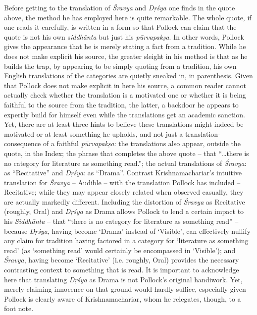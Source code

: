 Before getting to the translation of \textit{Śravya} and \textit{Dṛśya} one finds in the quote above, the method he has employed here is quite remarkable. The whole quote, if one reads it carefully, is written in a form so that Pollock can claim that the quote is not his own s\textit{iddhānta} but just his \textit{pūrvapakṣa}. In other words, Pollock gives the appearance that he is merely stating a fact from a tradition. While he does not make explicit his source, the greater sleight in his method is that as he builds the trap, by appearing to be simply quoting from a tradition, his own English translations of the categories are quietly sneaked in, in parenthesis. Given that Pollock does not make explicit in here his source, a common reader cannot actually check whether the translation is a motivated one or whether it is being faithful to the source from the tradition, the latter, a backdoor he appears to expertly build for himself even while the translations get an academic sanction. Yet, there are at least three hints to believe these translations might indeed be motivated or at least something he upholds, and not just a translation-consequence of a faithful \textit{pūrvapakṣa}: the translations also appear, outside the quote, in the Index; the phrase that completes the above quote – that “…there is no category for literature as something read.”; the actual translations of \textit{Śravya}: as “Recitative” and \textit{Dṛśya}: as “Drama”. Contrast Krishnamachariar’s intuitive translation for \textit{Śravya} – Audible – with the translation Pollock has included – Recitative; while they may appear closely related when observed casually, they are actually markedly different. Including the distortion of \textit{Śravya} as Recitative (roughly, Oral) and \textit{Dṛśya} as Drama allows Pollock to lend a certain impact to his \textit{Siddhānta} – that “there is no category for literature as something read” – because \textit{Dṛśya}, having become ‘Drama’ instead of ‘Visible’, can effectively nullify any claim for tradition having factored in a category for ‘literature as something read’ (as ‘something read’ would certainly be encompassed in ‘Visible’); and \textit{Śravya}, having become ‘Recitative’ (i.e. roughly, Oral) provides the necessary contrasting context to something that is read. It is important to acknowledge here that translating \textit{Dṛśya} as Drama is not Pollock’s original handiwork. Yet, merely claiming innocence on that ground would hardly suffice, especially given Pollock is clearly aware of Krishnamachariar, whom he relegates, though, to a foot note.

